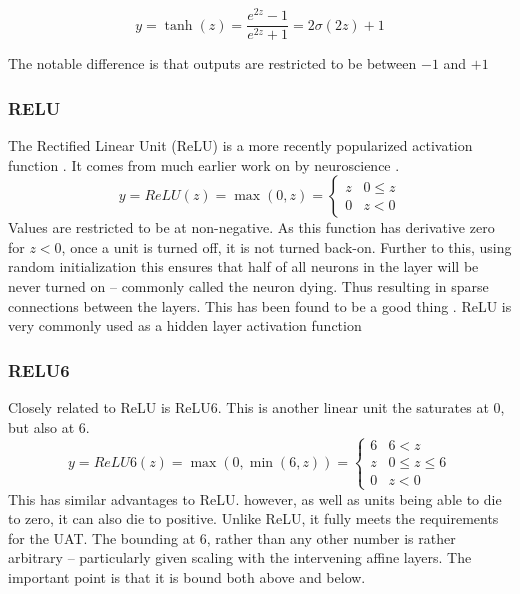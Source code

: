 \documentclass[12pt,parskip]{komatufte}
\begin{document}
\begin{equation}
y=\tanh(z)=\frac{e^{2z}-1}{e^{2z}+1}=2\sigma(2z)+1
\end{equation}

The notable difference is that outputs are restricted to be between $-1$ and $+1$

\subsubsection{RELU}
The Rectified Linear Unit (ReLU) is a more recently popularized activation function .
It comes from much earlier work on by neuroscience .
\begin{equation}
y=ReLU(z)=\max \left( 0, z \right)=\begin{cases}
z & 0\le z\\
0 & z<0
\end{cases}
\end{equation}
Values are restricted to be at non-negative.
As this function has derivative zero for $z<0$, once a unit is turned off, it is not turned back-on.
Further to this, using random initialization this ensures that half of all neurons in the layer will be never turned on -- commonly called the neuron dying.
Thus resulting in sparse connections between the layers.
This has been found to be a good thing .
ReLU is very commonly used as a hidden layer activation function


\subsubsection{RELU6}

Closely related to ReLU is ReLU6.
This is another linear unit the saturates at 0, but also at 6.
\begin{equation}
y=ReLU6(z)=\max \left(0, \min\left(6, z\right) \right) =  \begin{cases}
6 & 6<z\\
z & 0\le z\le6\\
0 & z<0
\end{cases}
\end{equation}
This has similar advantages to ReLU.
however, as well as units being able to die to zero, it can also die to positive.
Unlike ReLU, it fully meets the requirements for the UAT.
The bounding at 6, rather than any other number is rather arbitrary -- particularly given scaling with the intervening affine layers.
The important point is that it is bound both above and below.
\end{document}

